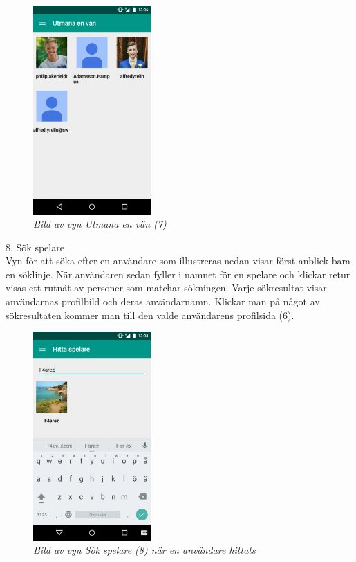 \documentclass[a4paper, 11pt]{article}
\begin{document}
\begin{figure}[H]
	\begin{center}
	\includegraphics[width=0.4\textwidth]{app_challenge} 
	\end{center}
	\caption{\textit{Bild av vyn Utmana en vän (7)}}
\end{figure}

\pagebreak
\large \textup{8. Sök spelare}\\
Vyn för att söka efter en användare som illustreras nedan visar först anblick bara en söklinje. När användaren sedan fyller i namnet för en spelare och klickar retur visas ett rutnät av personer som matchar sökningen. Varje sökresultat visar användarnas profilbild och deras användarnamn. Klickar man på något av sökresultaten kommer man till  den valde användarens profilsida (6).  
\begin{figure}[H]
	\begin{center}
	\includegraphics[width=0.4\textwidth]{app_search} 
	\end{center}
	\caption{\textit{Bild av vyn Sök spelare (8) när en användare hittats}}
\end{figure}
\end{document}

